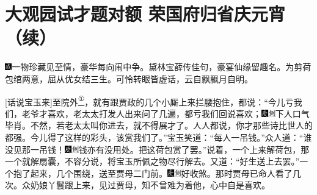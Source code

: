 

\chapter{大观园试才题对额 荣国府归省庆元宵（续）}
{\includegraphics[width=3mm]{../Images/00005}一物珍藏见至情，豪华每向闹中争。黛林宝薛传佳句，豪宴仙缘留趣名。为剪荷包绾两意，屈从优女结三生。可怜转眼皆虚话，云自飘飘月自明。}

{[}话说宝玉来{]}至院外\href{../Text/part0022_split_000.html\#lnkback_1_a}{\textsuperscript{①}}，就有跟贾政的几个小厮上来拦腰抱住，都说：``今儿亏我们，老爷才喜欢，老太太打发人出来问了几遍，都亏我们回说喜欢；{\includegraphics[width=3mm]{../Images/00004}\includegraphics[width=3mm]{../Images/00011}\footnotesize \kaishu 下人口气毕肖。}不然，若老太太叫你进去，就不得展才了。人人都说，你才那些诗比世人的都强。今儿得了这样的彩头，该赏我们了。''宝玉笑道：``每人一吊钱。''众人道：``谁没见那一吊钱！{\includegraphics[width=3mm]{../Images/00004}\includegraphics[width=3mm]{../Images/00011}\footnotesize \kaishu 钱亦有没用处。}把这荷包赏了罢。''说着，一个上来解荷包，那一个就解扇囊，不容分说，将宝玉所佩之物尽行解去。又道：``好生送上去罢。''一个抱了起来，几个围绕，送至贾母二门前。{\includegraphics[width=3mm]{../Images/00004}\includegraphics[width=3mm]{../Images/00011}\footnotesize \kaishu 好收煞。}那时贾母已命人看了几次。众奶娘丫鬟跟上来，见过贾母，知不曾难为着他，心中自是喜欢。

